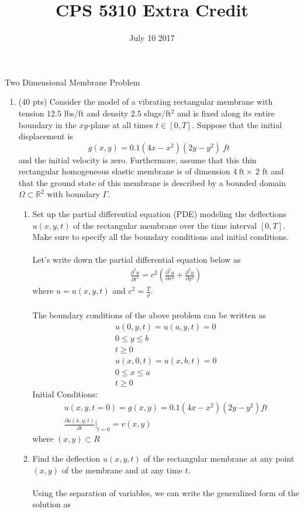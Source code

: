 \documentclass[12pt]{article}
\title{CPS 5310 Extra Credit}
\date{July 10 2017}
\begin{document}
	
\maketitle

Two Dimensional Membrane Problem
\begin{enumerate}[{\bf I.}] 
\item (40 pts) 
 Consider the model of a vibrating rectangular membrane with tension $12.5$ lbs/ft and density $2.5$ slugs/ft$^2$ and is fixed along its entire boundary in the $xy$-plane at all times $t \in [0,T]$.
Suppose that the initial displacement is %
\[
g(x,y)=0.1(4x-x^2)(2y- y^2) \ ft
\]
and the initial velocity is zero. Furthermore, assume that
this thin rectangular homogeneous elastic membrane is of dimension $4 \ { \text {ft}} \times \ 2$ ft and that the ground state of this membrane is described by a bounded domain $\Omega\subset \mathbb{R}^2$ with boundary $\Gamma.$ %
\begin{enumerate}
\item 
Set up the partial differential equation (PDE) modeling the deflections $u(x,y,t)$ of the rectangular membrane over the time interval $[0,T]$. Make sure to specify all the boundary conditions and initial conditions.
\\\\
Let's write down the partial differential equation below as
\begin{align}
\frac{\partial^2 u}{\partial t^2} = c^2 (\frac{\partial^2 u}{\partial x^2} + \frac{\partial^2 u}{\partial y^2})
\end{align}
where $u = u(x,y,t) $ and $c^2= \frac{T}{\rho}$.
\\\\

The boundary conditions of the above problem can be written as
\begin{align}
  u(0,y,t) = u(a,y,t) = 0 
  \nonumber
  \\  0 \leq y \leq b 
  \nonumber
  \\ t\geq 0
  \\u(x,0,t) = u(x,b,t) = 0 
  \nonumber
  \\  0 \leq x \leq a 
  \nonumber
  \\ t\geq 0
\end{align}
 Initial Conditions:
 \begin{align}
 u(x,y,t = 0) = g(x,y) =0.1(4x -x^2)(2y -y^2)ft
 \\ {\frac{\partial u(x,y,t)}{\partial t}\Bigg|}_{t=0} = v(x,y)   
 \end{align}
where $(x,y) \subset R$
\item Find the deflection $u(x,y,t)$ of the rectangular membrane at any point $(x,y)$ of the membrane and at any time $t$. 
 \\\\
  Using the separation of variables, we can write the generalized form of the solution as 
  

\end{enumerate}
\end{enumerate}
\end{document}
